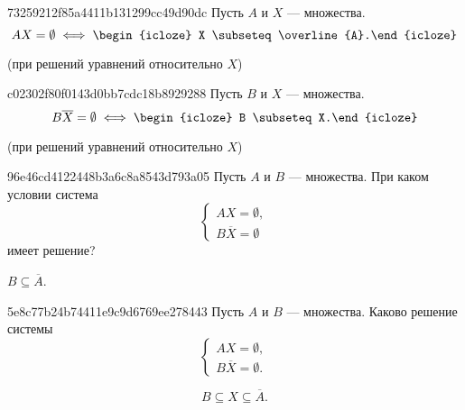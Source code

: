\begin{note}{73259212f85a4411b131299cc49d90dc}
    Пусть \({ A }\) и \({ X }\) --- множества.
    \[
        AX = \emptyset \iff \begin{icloze}{1}X \subseteq \overline{A}.\end{icloze}
    \]

    \begin{center}
        \tiny
        (при решений уравнений относительно \({ X }\))
    \end{center}
\end{note}

\begin{note}{c02302f80f0143d0bb7cdc18b8929288}
    Пусть \({ B }\) и \({ X }\) --- множества.
    \[
        B \overline{X} = \emptyset \iff \begin{icloze}{1}B \subseteq X.\end{icloze}
    \]

    \begin{center}
        \tiny
        (при решений уравнений относительно \({ X }\))
    \end{center}
\end{note}

\begin{note}{96e46cd4122448b3a6c8a8543d793a05}
    Пусть \({ A }\) и \({ B }\) --- множества.
    При каком условии система
    \[
        \begin{cases}
            AX = \emptyset, \\
            B \overline{X} = \emptyset
        \end{cases}
    \]
    имеет решение?

    \begin{cloze}{1}
        \({ B \subseteq \overline{A} }\).
    \end{cloze}
\end{note}

\begin{note}{5e8c77b24b74411e9c9d6769ee278443}
    Пусть \({ A }\) и \({ B }\) --- множества.
    Каково решение системы
    \[
        \begin{cases}
            AX = \emptyset, \\
            B \overline{X} = \emptyset.
        \end{cases}
    \]

    \begin{cloze}{1}
        \[
            B \subseteq X \subseteq \overline{A}.
        \]
    \end{cloze}
\end{note}

